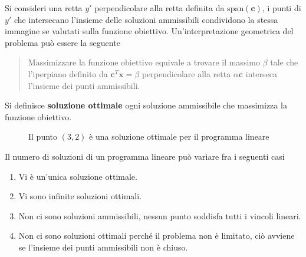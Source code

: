 \documentclass[10pt, letterpaper]{report}
\begin{document}
\begin{figure}[h]
\end{figure}
Si consideri una retta $y'$ perpendicolare alla retta definita da $\text{span}(\mathbf c)$, i punti di $y'$ che intersecano l'insieme delle soluzioni ammissibili condividono la stessa immagine se valutati sulla funzione obiettivo. Un'interpretazione geometrica del problema può essere la seguente\begin{quotation}
    Massimizzare la funzione obiettivo equivale a trovare il massimo $\beta$ tale che l'iperpiano definito da $\mathbf c^T\mathbf x = \beta$ perpendicolare alla retta $\alpha \mathbf c$ interseca l'insieme dei punti ammissibili.
\end{quotation}
Si definisce \textbf{soluzione ottimale} ogni soluzione ammissibile che massimizza la funzione obiettivo.
\begin{figure}[h]
    \caption{Il punto $(3,2)$ è una soluzione ottimale per il programma lineare}
        \label{LP_esempio3}
\end{figure}
Il numero di soluzioni di un programma lineare può variare fra i seguenti casi\begin{enumerate}
    \item Vi è un'unica soluzione ottimale.
    \item Vi sono infinite soluzioni ottimali.
    \item Non ci sono soluzioni ammissibili, nessun punto soddisfa tutti i vincoli lineari.
    \item Non ci sono soluzioni ottimali perché il problema non è limitato, ciò avviene se l'insieme dei punti ammissibili non è chiuso.
\end{enumerate}
\end{document}
